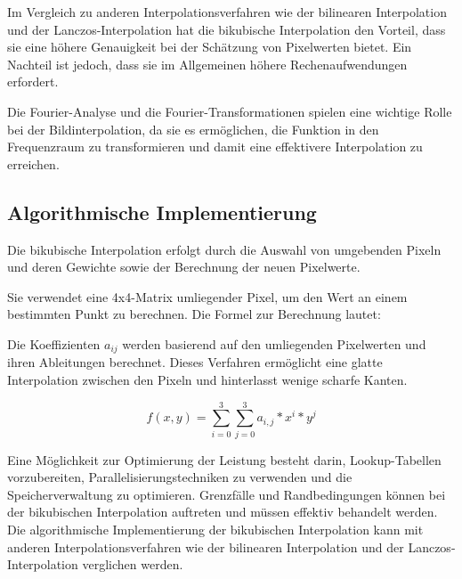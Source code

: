 Im Vergleich zu anderen Interpolationsverfahren wie der bilinearen Interpolation und der Lanczos-Interpolation hat die bikubische Interpolation den Vorteil, dass sie eine höhere Genauigkeit bei der Schätzung von Pixelwerten bietet.
Ein Nachteil ist jedoch, dass sie im Allgemeinen höhere Rechenaufwendungen erfordert.

Die Fourier-Analyse und die Fourier-Transformationen spielen eine wichtige Rolle bei der Bildinterpolation, da sie es ermöglichen, die Funktion in den Frequenzraum zu transformieren und damit eine effektivere Interpolation zu erreichen.

\subsection{Algorithmische Implementierung}



    
Die bikubische Interpolation erfolgt durch die Auswahl von umgebenden Pixeln und deren Gewichte sowie der Berechnung der neuen Pixelwerte.

Sie verwendet eine 4x4-Matrix umliegender Pixel, um den Wert an einem bestimmten Punkt zu berechnen.
Die Formel zur Berechnung lautet:

Die Koeffizienten $a_{ij}$ werden basierend auf den umliegenden Pixelwerten und ihren Ableitungen berechnet.
Dieses Verfahren ermöglicht eine glatte Interpolation zwischen den Pixeln und hinterlasst wenige scharfe Kanten.

\begin{equation}
    f(x,y) = \sum_{i=0}^{3}\sum_{j=0}^{3}a_{i,j}*x^{i}*y^{j}
\end{equation}

Eine Möglichkeit zur Optimierung der Leistung besteht darin, Lookup-Tabellen vorzubereiten, Parallelisierungstechniken zu verwenden und die Speicherverwaltung zu optimieren.
Grenzfälle und Randbedingungen können bei der bikubischen Interpolation auftreten und müssen effektiv behandelt werden.
Die algorithmische Implementierung der bikubischen Interpolation kann mit anderen Interpolationsverfahren wie der bilinearen Interpolation und der Lanczos-Interpolation verglichen werden.

